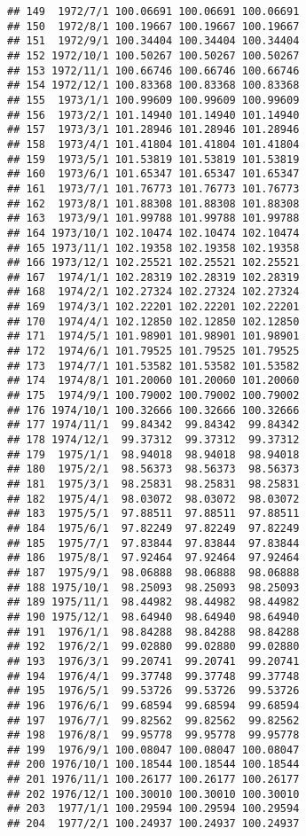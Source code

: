 \documentclass[
]{article}
\begin{document}
\begin{verbatim}
## 149  1972/7/1 100.06691 100.06691 100.06691
## 150  1972/8/1 100.19667 100.19667 100.19667
## 151  1972/9/1 100.34404 100.34404 100.34404
## 152 1972/10/1 100.50267 100.50267 100.50267
## 153 1972/11/1 100.66746 100.66746 100.66746
## 154 1972/12/1 100.83368 100.83368 100.83368
## 155  1973/1/1 100.99609 100.99609 100.99609
## 156  1973/2/1 101.14940 101.14940 101.14940
## 157  1973/3/1 101.28946 101.28946 101.28946
## 158  1973/4/1 101.41804 101.41804 101.41804
## 159  1973/5/1 101.53819 101.53819 101.53819
## 160  1973/6/1 101.65347 101.65347 101.65347
## 161  1973/7/1 101.76773 101.76773 101.76773
## 162  1973/8/1 101.88308 101.88308 101.88308
## 163  1973/9/1 101.99788 101.99788 101.99788
## 164 1973/10/1 102.10474 102.10474 102.10474
## 165 1973/11/1 102.19358 102.19358 102.19358
## 166 1973/12/1 102.25521 102.25521 102.25521
## 167  1974/1/1 102.28319 102.28319 102.28319
## 168  1974/2/1 102.27324 102.27324 102.27324
## 169  1974/3/1 102.22201 102.22201 102.22201
## 170  1974/4/1 102.12850 102.12850 102.12850
## 171  1974/5/1 101.98901 101.98901 101.98901
## 172  1974/6/1 101.79525 101.79525 101.79525
## 173  1974/7/1 101.53582 101.53582 101.53582
## 174  1974/8/1 101.20060 101.20060 101.20060
## 175  1974/9/1 100.79002 100.79002 100.79002
## 176 1974/10/1 100.32666 100.32666 100.32666
## 177 1974/11/1  99.84342  99.84342  99.84342
## 178 1974/12/1  99.37312  99.37312  99.37312
## 179  1975/1/1  98.94018  98.94018  98.94018
## 180  1975/2/1  98.56373  98.56373  98.56373
## 181  1975/3/1  98.25831  98.25831  98.25831
## 182  1975/4/1  98.03072  98.03072  98.03072
## 183  1975/5/1  97.88511  97.88511  97.88511
## 184  1975/6/1  97.82249  97.82249  97.82249
## 185  1975/7/1  97.83844  97.83844  97.83844
## 186  1975/8/1  97.92464  97.92464  97.92464
## 187  1975/9/1  98.06888  98.06888  98.06888
## 188 1975/10/1  98.25093  98.25093  98.25093
## 189 1975/11/1  98.44982  98.44982  98.44982
## 190 1975/12/1  98.64940  98.64940  98.64940
## 191  1976/1/1  98.84288  98.84288  98.84288
## 192  1976/2/1  99.02880  99.02880  99.02880
## 193  1976/3/1  99.20741  99.20741  99.20741
## 194  1976/4/1  99.37748  99.37748  99.37748
## 195  1976/5/1  99.53726  99.53726  99.53726
## 196  1976/6/1  99.68594  99.68594  99.68594
## 197  1976/7/1  99.82562  99.82562  99.82562
## 198  1976/8/1  99.95778  99.95778  99.95778
## 199  1976/9/1 100.08047 100.08047 100.08047
## 200 1976/10/1 100.18544 100.18544 100.18544
## 201 1976/11/1 100.26177 100.26177 100.26177
## 202 1976/12/1 100.30010 100.30010 100.30010
## 203  1977/1/1 100.29594 100.29594 100.29594
## 204  1977/2/1 100.24937 100.24937 100.24937

\end{verbatim}
\end{document}
